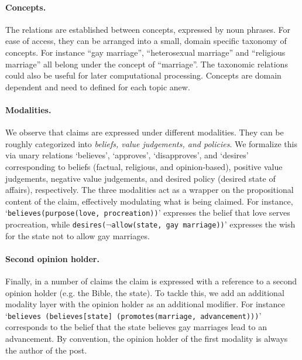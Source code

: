 \paragraph{Concepts. }
The relations are established between concepts, expressed by noun phrases. 
For ease of access, they can be arranged into a small, domain specific taxonomy of concepts. 
For instance ``gay marriage'', ``heterosexual marriage'' and ``religious marriage''
all belong under the concept of ``marriage''. 
The taxonomic relations could also be useful for later computational processing. 
Concepts are domain dependent and need to defined for each topic anew.

\paragraph{Modalities. }
We observe that claims are expressed under different modalities. 
They can be roughly categorized into \textit{beliefs, value judgements, and policies}. 
We formalize this via unary relations `believes', `approves', `disapproves',
and `desires' corresponding 
to beliefs (factual, religious, and opinion-based), positive value judgements, negative value 
judgements, and desired policy (desired state of affairs), respectively. 
The three modalities act as a wrapper on the propositional content of the claim, 
effectively modulating what is being claimed. 
For instance, `\texttt{believes(purpose(love, procreation))}' expresses the belief 
that love serves procreation, while \texttt{desires(}$\neg$\texttt{allow(state, gay marriage))}'
expresses the wish for the state not to allow gay marriages. 

\paragraph{Second opinion holder. }
Finally, in a number of claims the claim is expressed with a reference to a second
opinion holder (e.g. the Bible, the state). 
To tackle this, we add an additional modality layer with the opinion holder as
an additional modifier. 
For instance `\texttt{believes (believes[state] (promotes(marriage, advancement)))}' corresponds
to the belief that the state believes gay marriages lead to an advancement. 
By convention, the opinion holder of the first modality is always the author of the post. 

